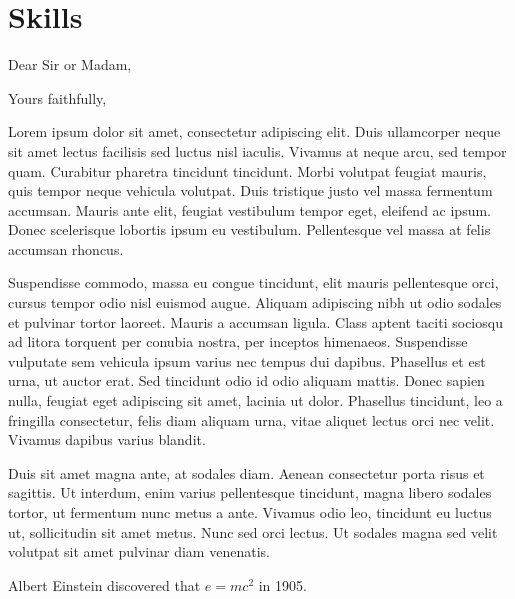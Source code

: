 \documentclass[11pt, sans]{moderncv}
\begin{document}
\section*{Skills}
\label{sec:orgff19005}

\clearpage
{}
\date{\today}
\opening{Dear Sir or Madam,}
\closing{Yours faithfully,}
\makelettertitle

Lorem ipsum dolor sit amet, consectetur adipiscing elit. Duis
ullamcorper neque sit amet lectus facilisis sed luctus nisl
iaculis. Vivamus at neque arcu, sed tempor quam. Curabitur pharetra
tincidunt tincidunt. Morbi volutpat feugiat mauris, quis tempor neque
vehicula volutpat. Duis tristique justo vel massa fermentum
accumsan. Mauris ante elit, feugiat vestibulum tempor eget, eleifend
ac ipsum. Donec scelerisque lobortis ipsum eu vestibulum. Pellentesque
vel massa at felis accumsan rhoncus.


Suspendisse commodo, massa eu congue tincidunt, elit mauris
pellentesque orci, cursus tempor odio nisl euismod augue. Aliquam
adipiscing nibh ut odio sodales et pulvinar tortor laoreet. Mauris a
accumsan ligula. Class aptent taciti sociosqu ad litora torquent per
conubia nostra, per inceptos himenaeos. Suspendisse vulputate sem
vehicula ipsum varius nec tempus dui dapibus. Phasellus et est urna,
ut auctor erat. Sed tincidunt odio id odio aliquam mattis. Donec
sapien nulla, feugiat eget adipiscing sit amet, lacinia ut
dolor. Phasellus tincidunt, leo a fringilla consectetur, felis diam
aliquam urna, vitae aliquet lectus orci nec velit. Vivamus dapibus
varius blandit.


Duis sit amet magna ante, at sodales diam. Aenean consectetur porta
risus et sagittis. Ut interdum, enim varius pellentesque tincidunt,
magna libero sodales tortor, ut fermentum nunc metus a ante. Vivamus
odio leo, tincidunt eu luctus ut, sollicitudin sit amet metus. Nunc
sed orci lectus. Ut sodales magna sed velit volutpat sit amet pulvinar
diam venenatis.


Albert Einstein discovered that \(e=mc^2\) in 1905.


\makeletterclosing
\end{document}
